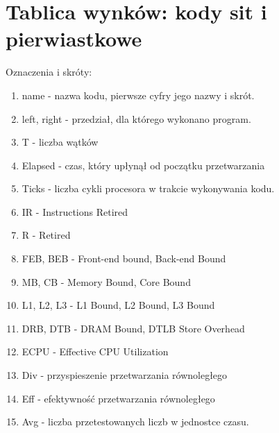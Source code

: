 \documentclass[12pt]{article}
\begin{document}
\section{Tablica wynków: kody sit i pierwiastkowe}
Oznaczenia i skróty:
\begin{enumerate}
	\item name - nazwa kodu, pierwsze cyfry jego nazwy i skrót.
	\item left, right - przedział, dla którego wykonano program.
	\item T - liczba wątków
	\item Elapsed - czas, który upłynął od początku przetwarzania
	\item Ticks - liczba cykli procesora w trakcie wykonywania kodu.
	\item IR - Instructions Retired
	\item R - Retired
	\item FEB, BEB - Front-end bound, Back-end Bound
	\item MB, CB - Memory Bound,  Core Bound
	\item L1, L2, L3 - L1 Bound, L2 Bound, L3 Bound
	\item DRB, DTB - DRAM Bound, DTLB Store Overhead
	\item ECPU - Effective CPU Utilization
	\item Div - przyspieszenie przetwarzania równoległego
	\item Eff - efektywność przetwarzania równoległego
	\item Avg - liczba przetestowanych liczb w jednostce czasu.
\end{enumerate}
\end{document}
